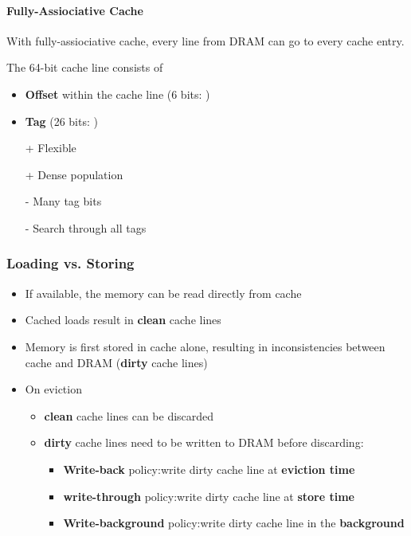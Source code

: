 \paragraph{Fully-Assiociative Cache}
With fully-assiociative cache, every line from DRAM can go to every cache entry.

\newpar{}
The 64-bit cache line consists of
\begin{itemize}
    \item \textbf{Offset} within the cache line (6 bits: )
    \item \textbf{Tag} (26 bits: )
\end{itemize}

\newpar{}
\begin{itemize}
    \item[+] Flexible
    \item[+] Dense population
    \item[-] Many tag bits
    \item[-] Search through all tags
\end{itemize}

\subsubsection{Loading vs. Storing}
\begin{itemize}
    \item If available, the memory can be read directly from cache
    \item Cached loads result in \textbf{clean} cache lines
\end{itemize}

\newpar{}
\begin{itemize}
    \item Memory is first stored in cache alone, resulting in inconsistencies between cache and DRAM (\textbf{dirty} cache lines)
    \item On eviction
          \begin{itemize}
              \item \textbf{clean} cache lines can be discarded
              \item \textbf{dirty} cache lines need to be written to DRAM before discarding:
                    \begin{itemize}
                        \item \textbf{Write-back} policy:\newline write dirty cache line at \textbf{eviction time}
                        \item \textbf{write-through} policy:\newline write dirty cache line at \textbf{store time}
                        \item \textbf{Write-background} policy:\newline write dirty cache line in the \textbf{background}
                    \end{itemize}
          \end{itemize}
\end{itemize}